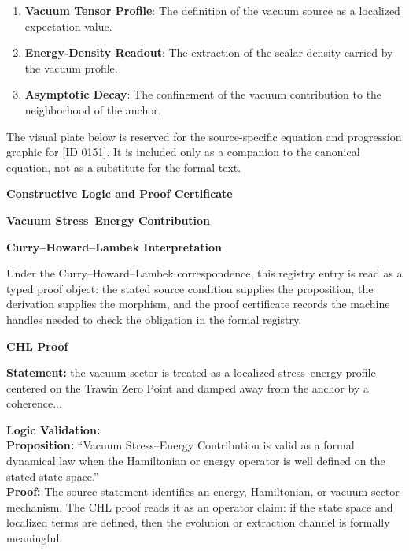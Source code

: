 \begin{enumerate}[leftmargin=1.6em,itemsep=6pt,topsep=4pt]
\item \textbf{Vacuum Tensor Profile}: The definition of the vacuum source as a localized expectation value.
\item \textbf{Energy-Density Readout}: The extraction of the scalar density carried by the vacuum profile.
\item \textbf{Asymptotic Decay}: The confinement of the vacuum contribution to the neighborhood of the anchor.
\end{enumerate}

\begingroup\footnotesize\sloppy
The visual plate below is reserved for the source-specific equation and progression graphic for [ID 0151]. It is included only as a companion to the canonical equation, not as a substitute for the formal text.
\par\endgroup
\ifTZPDarkEdition
{}
\fi

\clearpage
\begingroup\tzpsupportsetup
\noindent\textbf{\fontsize{10.8pt}{12.8pt}\selectfont [ID 0151] Constructive Logic and Proof Certificate}\par
\noindent\textbf{\fontsize{10pt}{12pt}\selectfont Vacuum Stress--Energy Contribution}\par
\vspace{0.45em}
\begingroup
\footnotesize
\setlength{\parskip}{0.22em}
\setlength{\parindent}{0pt}
\noindent\textbf{Curry--Howard--Lambek Interpretation}\par
Under the Curry--Howard--Lambek correspondence, this registry entry is read as a typed proof
object: the stated source condition supplies the proposition, the derivation supplies the
morphism, and the proof certificate records the machine handles needed to check the obligation
in the formal registry.

\vspace{0.45em}
\noindent\textbf{CHL Proof}\par
\textbf{Statement:} the vacuum sector is treated as a localized stress--energy profile centered on the
Trawin Zero Point and damped away from the anchor by a coherence...

\textbf{Logic Validation:}\\
\textbf{Proposition:} ``Vacuum Stress--Energy Contribution is valid as a formal dynamical law when the
Hamiltonian or energy operator is well defined on the stated state space.''\\
\textbf{Proof:} The source statement identifies an energy, Hamiltonian, or vacuum-sector mechanism. The
CHL proof reads it as an operator claim: if the state space and localized terms are
defined, then the evolution or extraction channel is formally meaningful.

